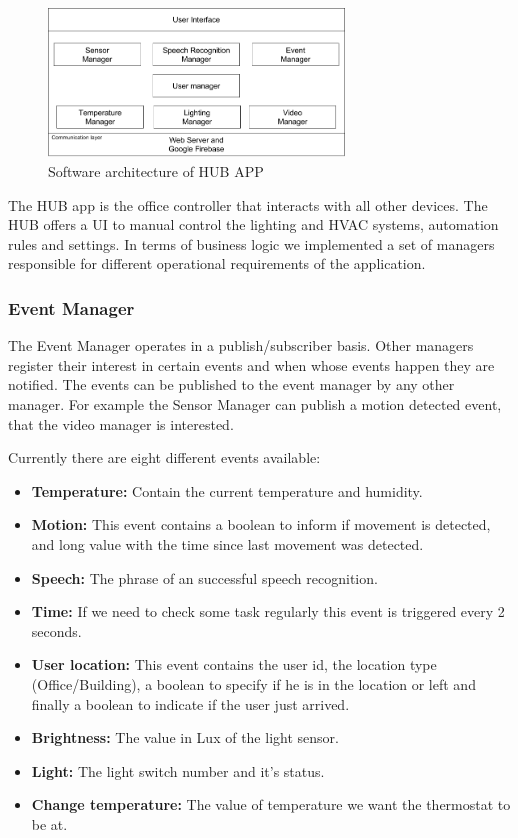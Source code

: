 \begin{figure}[h]
\centering
\includegraphics[width=0.7\textwidth]{Figures/software_implementation}
\caption{Software architecture of HUB APP}
\label{software_imp}
\end{figure}


The HUB app is the office controller that interacts with all other devices. The HUB offers a \ac{UI} to manual control the lighting and \ac{HVAC} systems, automation rules and settings. In terms of business logic we implemented a set of managers responsible for different operational requirements of the application.


\subsubsection{Event Manager}

The Event Manager  operates in a publish/subscriber basis. Other managers register their interest in certain events and when whose events happen they are notified. The events can be published to the event manager by any other manager. For example the Sensor Manager can publish a motion detected event, that the video manager is interested.

Currently there are eight different events available:

\begin{itemize}
  \item \textbf{Temperature:} Contain the current temperature and humidity.
  \item \textbf{Motion:} This event contains a boolean to inform if movement is detected, and long value with the time since last movement was detected.
  \item \textbf{Speech:} The phrase of an successful speech recognition.  
  \item \textbf{Time:} If we need to check some task regularly this event is triggered every 2 seconds.  
  \item \textbf{User location:} This event contains the user id, the location type (Office/Building), a boolean to specify if he is in the location or left and finally a boolean to indicate if the user just arrived.
  \item \textbf{Brightness:} The value in Lux of the light sensor.  
  \item \textbf{Light:} The light switch number and it's status. 
  \item \textbf{Change temperature:} The value of temperature we want the thermostat to be at. 
  
\end{itemize}


